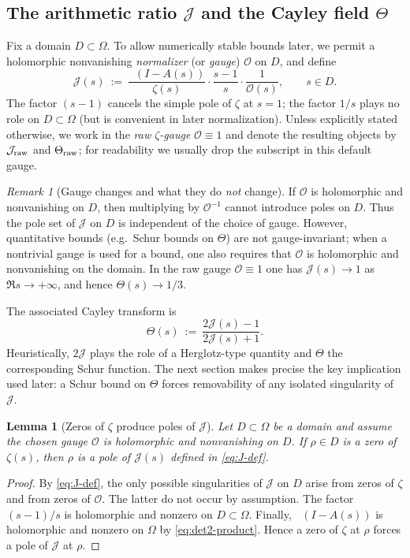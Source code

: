 \documentclass[11pt]{amsart}
\newtheorem{lemma}[theorem]{Lemma}
\theoremstyle{definition}
\theoremstyle{remark}
\newtheorem{remark}[theorem]{Remark}
\DeclareMathOperator{\dettwo}{det_2}
\begin{document}
\subsection*{The arithmetic ratio $\mathcal J$ and the Cayley field $\Theta$}
Fix a domain $D\subset\Omega$.
To allow numerically stable  bounds later, we permit a holomorphic nonvanishing \emph{normalizer}
(or \emph{gauge}) $\mathcal O$ on $D$, and define
\begin{equation}\label{eq:J-def}
  \mathcal{J}(s)\ :=\ \frac{\dettwo(I-A(s))}{\zeta(s)}\cdot \frac{s-1}{s}\cdot \frac{1}{\mathcal O(s)},\qquad s\in D.
\end{equation}
The factor $(s-1)$ cancels the simple pole of $\zeta$ at $s=1$; the factor $1/s$ plays no role on $D\subset\Omega$
(but is convenient in later normalization).
Unless explicitly stated otherwise, we work in the \emph{raw $\zeta$-gauge} $\mathcal O\equiv 1$ and denote the resulting
objects by $\mathcal J_{\rm raw}$ and $\Theta_{\rm raw}$; for readability we usually drop the subscript in this default gauge.
\begin{remark}[Gauge changes and what they do \emph{not} change]\label{rem:Ocan-role}
If $\mathcal O$ is holomorphic and nonvanishing on $D$, then multiplying by $\mathcal O^{-1}$ cannot introduce poles on $D$.
Thus the pole set of $\mathcal J$ on $D$ is independent of the choice of gauge.
However, quantitative bounds (e.g.\ Schur bounds on $\Theta$) are not gauge-invariant; when a nontrivial gauge is used for a
 bound, one also requires that $\mathcal O$ is holomorphic and nonvanishing on the domain.
In the raw gauge $\mathcal O\equiv 1$ one has $\mathcal J(s)\to 1$ as $\Re s\to+\infty$, and hence $\Theta(s)\to 1/3$.
\end{remark}

The associated Cayley transform is
\begin{equation}\label{eq:Theta-def}
  \Theta(s)\ :=\ \frac{2\mathcal J(s)-1}{2\mathcal J(s)+1}.
\end{equation}
Heuristically, $2\mathcal J$ plays the role of a Herglotz-type quantity and $\Theta$ the corresponding Schur function.
The next section makes precise the key implication used later: a Schur bound on $\Theta$ forces removability of any
isolated singularity of $\mathcal J$.
\begin{lemma}[Zeros of $\zeta$ produce poles of $\mathcal J$]\label{lem:poles}
Let $D\subset\Omega$ be a domain and assume the chosen gauge $\mathcal O$ is holomorphic and nonvanishing on $D$.
If $\rho\in D$ is a zero of $\zeta(s)$, then $\rho$ is a pole of $\mathcal J(s)$ defined in \eqref{eq:J-def}.
\end{lemma}
\begin{proof}
By \eqref{eq:J-def}, the only possible singularities of $\mathcal J$ on $D$ arise from zeros of $\zeta$ and from zeros of
$\mathcal O$. The latter do not occur by assumption. The factor $(s-1)/s$ is holomorphic and nonzero on $D\subset\Omega$.
Finally, $\dettwo(I-A(s))$ is holomorphic and nonzero on $\Omega$ by \eqref{eq:det2-product}. Hence a zero of $\zeta$ at $\rho$
forces a pole of $\mathcal J$ at $\rho$.
\end{proof}
\end{document}
